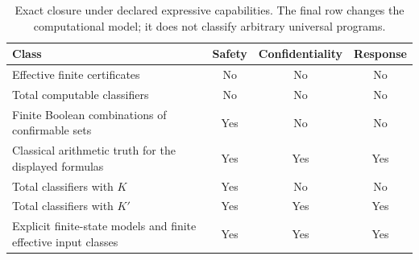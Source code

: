 \begin{table}[t]
\centering\small
\caption{Exact closure under declared expressive capabilities. The final row changes the computational model; it does not classify arbitrary universal programs.}
\label{tab:classes}
\begin{tabularx}{\textwidth}{Yccc}
\toprule
Class & Safety & Confidentiality & Response\\
\midrule
Effective finite certificates & No & No & No\\
Total computable classifiers & No & No & No\\
Finite Boolean combinations of confirmable sets & Yes & No & No\\
Classical arithmetic truth for the displayed formulas & Yes & Yes & Yes\\
Total classifiers with $K$ & Yes & No & No\\
Total classifiers with $K'$ & Yes & Yes & Yes\\
Explicit finite-state models and finite effective input classes & Yes & Yes & Yes\\
\bottomrule
\end{tabularx}
\end{table}
